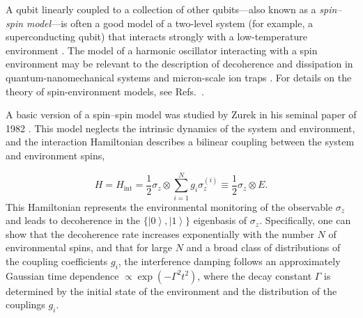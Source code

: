 \documentclass[3p,sort&compress]{elsarticle}
\newcommand{\ket}[1]{\left\vert{#1}\right\rangle}
\newcommand{\op}[1]{#1}
\begin{document}
A qubit linearly coupled to a collection of other qubits---also known as a \emph{spin--spin model}---is often a good model of a two-level system (for example, a superconducting qubit) that interacts strongly with a low-temperature environment \cite{Prokofev:2000:zz,Dube:2001:zz}. The model of a harmonic oscillator interacting with a spin environment may be relevant to the description of decoherence and dissipation in quantum-nanomechanical systems and micron-scale ion traps \cite{Schlosshauer:2008:os}. For details on the theory of spin-environment models, see Refs.~\cite{Dube:2001:zz,Stamp:1998:im,Prokofev:1995:ab,Prokofev:1993:aa}.

A basic version of a spin--spin model was studied by Zurek in his seminal paper of 1982 \cite{Zurek:1982:tv}. This model neglects the intrinsic dynamics of the system and environment, and the interaction Hamiltonian describes a bilinear coupling between the system and environment spins, 

%
\begin{equation}\label{eq:hse-zurek}
  \op{H} = \op{H}_\text{int} = \frac{1}{2} \op{\sigma}_z \otimes
   \sum_{i=1}^N g_i \op{\sigma}^{(i)}_z  \equiv
  \frac{1}{2} \op{\sigma}_z \otimes \op{E}.
\end{equation}
%
This Hamiltonian represents the environmental monitoring of the observable $\sigma_z$ and leads to decoherence in the $\{\ket{0},\ket{1}\}$ eigenbasis of $\op{\sigma}_z$. Specifically, one can show \cite{Zurek:1982:tv,Cucchietti:2005:om} that the decoherence rate increases exponentially with the number $N$ of environmental spins, and that for large $N$ and a broad class of distributions of the coupling coefficients $g_i$, the interference damping follows an approximately Gaussian time dependence
$\propto \exp(- \Gamma^2 t^2)$, where the decay constant $\Gamma$ is determined by the initial state of the environment and the distribution of the couplings $g_i$. 
\end{document}
